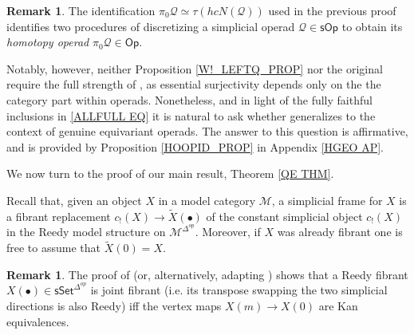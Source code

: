\documentclass[a4paper,10pt]{article}%
\numberwithin{equation}{section}
\numberwithin{figure}{section}
\theoremstyle{definition} %
\newtheorem{remark}[equation]{Remark}%
\newcommand{\vect}[1]{\text{\overrightharp{\ensuremath{#1}}}}
\newcommand{\1}{\ensuremath{\mathbbm 1}}%
\begin{document}
\begin{remark}\label{TWOHOMOP REM}
	The identification
	$\pi_0 \mathcal{Q} \simeq 
	\tau \left(h c N (\mathcal{Q}) \right)$ 
	\cite[Prop. 4.8]{CM13b}
	used in the previous proof
	identifies two procedures of discretizing 
	a simplicial operad $\mathcal{Q} \in \mathsf{sOp}$
	to obtain its \emph{homotopy operad}
	$\pi_0 \mathcal{Q} \in \mathsf{Op}$.

	Notably, however, neither 
	Proposition \ref{W!_LEFTQ_PROP}
	nor the original 
	\cite[Prop. 4.9]{CM13b}
	require the full strength
	of \cite[Prop. 4.8]{CM13b}, 
	as essential surjectivity depends only on the 
	the category part within operads.
	Nonetheless, and in light of the fully faithful inclusions in 
	\eqref{ALLFULL EQ}
	it is natural to ask
	whether \cite[Prop. 4.8]{CM13b}
	generalizes to the context of genuine equivariant operads.
	The answer to this question is affirmative,
	and is provided by Proposition \ref{HOOPID_PROP}
	in Appendix \ref{HGEO AP}.
%	
%	
\end{remark}



We now turn to the proof of our main result,
Theorem \ref{QE THM}.


Recall that, given an object $X$ in a model category $\mathcal{M}$,
a simplicial frame for $X$ is a fibrant replacement
$c_!(X) \to \widetilde{X}(\bullet)$ of the constant 
simplicial object $c_!(X)$ in the Reedy model structure on $\mathcal{M}^{\Delta^{op}}$.
Moreover, if $X$ was already fibrant one is free to assume that $\widetilde{X}(0) = X$.

\begin{remark}\label{JOINTFIB REM}
	The proof of \cite[Prop. 4.5(ii)]{BP_edss}
	(or, alternatively, adapting \cite[Prop. 4.24(ii)]{BP_edss})
	shows that a Reedy fibrant $X(\bullet) \in \mathsf{sSet}^{\Delta^{op}}$
	is joint fibrant (i.e. its transpose swapping the two simplicial directions is also Reedy)
	iff the vertex maps $X(m) \to X(0)$
	are Kan equivalences.
\end{remark}
\end{document}
